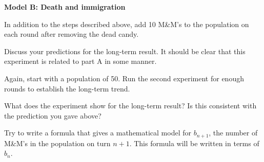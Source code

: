 \documentclass[addpoints, 12pt]{exam}
\newcommand{\mnms}{M\&M's }
\begin{document}
\textbf{Model B: Death and immigration}
\bigskip

In addition to the steps described above, add 10 \mnms to the population on each round after removing the dead candy.

\smallskip

\begin{questions}

\question
Discuss your predictions for the long-term result.  It should be clear that this experiment is related to part A in some manner.


\question
Again, start with a population of 50.  Run the second experiment for enough rounds to establish the long-term trend.


\question
What does the experiment show for the long-term result? Is this consistent with the prediction you gave above?


\question
Try to write a formula that gives a mathematical model for $b_{n+1}$, the number of \mnms in the population on turn $n+1$.  This formula will be written in terms of $b_n$.


\end{questions}
\end{document}
